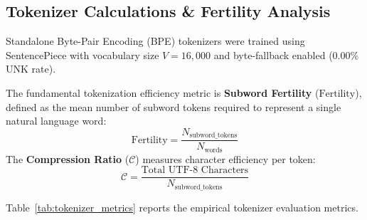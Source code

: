 \documentclass[11pt,a4paper]{article}
\begin{document}
\subsection{Tokenizer Calculations \& Fertility Analysis}
Standalone Byte-Pair Encoding (BPE) tokenizers were trained using SentencePiece with vocabulary size $V = 16,000$ and byte-fallback enabled ($0.00\%$ UNK rate).

The fundamental tokenization efficiency metric is \textbf{Subword Fertility} ($\text{Fertility}$), defined as the mean number of subword tokens required to represent a single natural language word:
\begin{equation}
    \text{Fertility} = \frac{N_{\text{subword\_tokens}}}{N_{\text{words}}}
\end{equation}
The \textbf{Compression Ratio} ($\mathcal{C}$) measures character efficiency per token:
\begin{equation}
    \mathcal{C} = \frac{\text{Total UTF-8 Characters}}{N_{\text{subword\_tokens}}}
\end{equation}

Table~\ref{tab:tokenizer_metrics} reports the empirical tokenizer evaluation metrics.

\begin{table}[htbp]
\centering
\small
\caption{SentencePiece BPE Tokenizer Evaluation ($V=16,000$ vocabulary).}
\label{tab:tokenizer_metrics}
\vspace{2pt}
\end{table}
\end{document}
